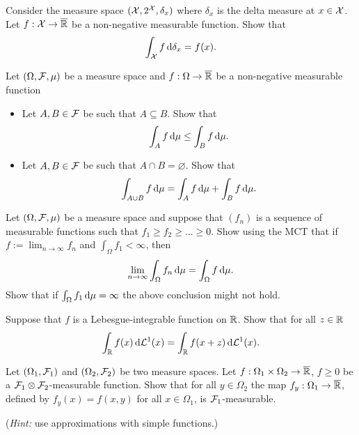 \begin{problem} Consider the measure space $(\mathcal X, 2^{\mathcal X},\delta_x)$ where $\delta_x$ is the delta measure at $x\in \mathcal X$. Let $f:\mathcal X\to \overline{\mathbb R}$ be a non-negative measurable function. Show that 
\begin{equation*}
    \int_{\mathcal X} f \,\mathrm{d} \delta_x = f(x).
\end{equation*}  
\end{problem}

\begin{problem}
    Let $(\Omega,\mathcal F,\mu)$ be a measure space and $f:\Omega\to \overline{\mathbb R}$ be a non-negative measurable function
    \begin{itemize}
        \item Let $A,B\in \mathcal F$ be such that $A\subseteq B$. Show that
        \begin{equation*}
            \int_{A} f\,\mathrm{d} \mu \leq  \int_{B} f\,\mathrm{d} \mu.
        \end{equation*}
        \item Let $A,B\in \mathcal F$ be such that $A\cap B = \varnothing$. Show that 
        \begin{equation*}
            \int_{A\cup B} f\,\mathrm{d} \mu =  \int_{A} f\,\mathrm{d} \mu + \int_{B} f\,\mathrm{d} \mu.
        \end{equation*}
    \end{itemize}
\end{problem}

\begin{problem} Let $(\Omega,\mathcal F,\mu)$ be a measure space and suppose that $(f_{n})$ is a sequence of measurable functions such that $f_1\geq f_2\geq\ldots \geq 0$. Show using the MCT that if $f :=\lim_{n\to\infty} f_n$ and $\int_{\Omega} f_1<\infty$, then
\begin{equation*}
    \lim_{n\to\infty} \int_\Omega f_n\,\mathrm{d} \mu =  \int_\Omega f\,\mathrm{d} \mu.
\end{equation*}
Show that if $\int_{\Omega} f_1\,\mathrm{d} \mu = \infty$ the above conclusion might not hold.    
\end{problem}

\begin{problem} Suppose that $f$ is a Lebesgue-integrable function on $\mathbb R$. Show that for all $z\in \mathbb R$
    \begin{equation*}
        \int_{\mathbb R} f(x)\,\mathrm{d} \mathcal L^1(x) = \int_{\mathbb R} f(x+z)\,\mathrm{d} \mathcal L^1(x).
    \end{equation*}
\end{problem}

\begin{problem}
    Let $(\Omega_1,\mathcal F_1)$ and $(\Omega_2,\mathcal F_2)$ be two measure spaces. Let $f:\Omega_1\times\Omega_2\to \overline{\mathbb R}$, $f\geq 0$ be a $\mathcal F_1\otimes \mathcal F_2$-measurable function. Show that for all $y\in \Omega_2$ the map $f_y : \Omega_1\to \overline{\mathbb R}$, defined by $f_y(x) = f(x,y)$ for all $x\in \Omega_1$, is $\mathcal F_1$-measurable.

    \noindent (\emph{Hint:} use approximations with simple functions.)
\end{problem}